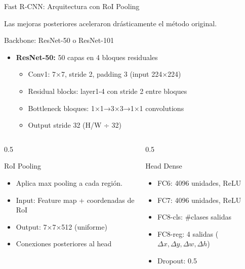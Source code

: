 \documentclass[aspectratio=169, 10pt]{beamer}
\begin{document}
\begin{frame}[shrink]{Fast R-CNN: Arquitectura con RoI Pooling}

	Las mejoras posteriores aceleraron dr\'asticamente el m\'etodo original.

	\vspace{0.2cm}

	\begin{block}{Backbone: ResNet-50 o ResNet-101}
		\small
		\begin{itemize}
			\item \textbf{ResNet-50:} 50 capas en 4 bloques residuales
			\begin{itemize}
				\item Conv1: 7×7, stride 2, padding 3 (input 224×224)
				\item Residual blocks: layer1-4 con stride 2 entre bloques
				\item Bottleneck bloques: 1×1→3×3→1×1 convolutions
				\item Output stride 32 (H/W ÷ 32)
			\end{itemize}
		\end{itemize}
	\end{block}

	\vspace{0.2cm}

	\begin{columns}[T]
		\begin{column}{0.5\textwidth}
			\begin{block}{RoI Pooling}
				\small
				\begin{itemize}
					\item Aplica max pooling a cada regi\'on.
					\item Input: Feature map + coordenadas de RoI
					\item Output: 7×7×512 (uniforme)
					\item Conexiones posteriores al head
				\end{itemize}
			\end{block}
		\end{column}

		\begin{column}{0.5\textwidth}
			\begin{block}{Head Dense}
				\small
				\begin{itemize}
					\item FC6: 4096 unidades, ReLU
					\item FC7: 4096 unidades, ReLU
					\item FC8-cls: \#clases salidas
					\item FC8-reg: 4 salidas ($\Delta x, \Delta y, \Delta w, \Delta h$)
					\item Dropout: 0.5
				\end{itemize}
			\end{block}
		\end{column}
	\end{columns}

\end{frame}
\end{document}
